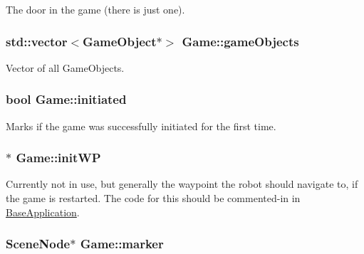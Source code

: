 \-The door in the game (there is just one). \hypertarget{classGame_a9fbc762ef50edb2804683eaafb3d45f3}{
\subsubsection[{game\-Objects}]{\setlength{\rightskip}{0pt plus 5cm}std\-::vector$<${\bf \-Game\-Object}$\ast$$>$ {\bf \-Game\-::game\-Objects}}}\label{classGame_a9fbc762ef50edb2804683eaafb3d45f3}
\-Vector of all \-Game\-Objects. \hypertarget{classGame_aea14eeeea7d21e4ec2353957275aa8d9}{
\subsubsection[{initiated}]{\setlength{\rightskip}{0pt plus 5cm}bool {\bf \-Game\-::initiated}}}\label{classGame_aea14eeeea7d21e4ec2353957275aa8d9}
\-Marks if the game was successfully initiated for the first time. \hypertarget{classGame_a9f00f5b2803e11c6916f5b473b16af74}{
\subsubsection[{init\-W\-P}]{$\ast$ {\bf \-Game\-::init\-W\-P}}}\label{classGame_a9f00f5b2803e11c6916f5b473b16af74}
\-Currently not in use, but generally the waypoint the robot should navigate to, if the game is restarted. \-The code for this should be commented-\/in in \hyperlink{classBaseApplication}{\-Base\-Application}. \hypertarget{classGame_a1ea0118411f7ae6315bc8e48dea4d074}{
\subsubsection[{marker}]{\setlength{\rightskip}{0pt plus 5cm}\-Scene\-Node$\ast$ {\bf \-Game\-::marker}}}\label{classGame_a1ea0118411f7ae6315bc8e48dea4d074}
